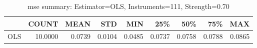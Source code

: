 \begin{table}[ht]
\centering
\caption{mse summary: Estimator=OLS, Instruments=111, Strength=0.70}
\begin{tabular}{lrrrrrrrr}
\toprule
 & COUNT & MEAN & STD & MIN & 25\% & 50\% & 75\% & MAX \\
\midrule
OLS & 10.0000 & 0.0739 & 0.0104 & 0.0485 & 0.0737 & 0.0758 & 0.0788 & 0.0865 \\
\bottomrule
\end{tabular}
\end{table}
